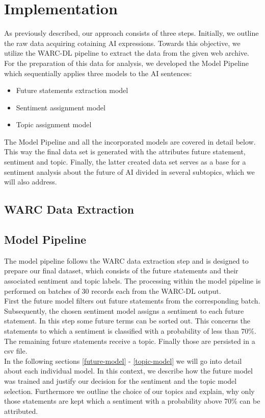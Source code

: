 \section{Implementation}
As previously described, our approach consists of three steps.
Initially, we outline the raw data acquiring cotaining AI expressions.
Towards this objective, we utilize the WARC-DL pipeline \citep{Deckers2022} to extract the data from the given web archive.
For the preparation of this data for analysis, we developed the Model Pipeline which sequentially applies three models to the AI sentences:
\begin{itemize}
    \item Future statements extraction model
    \item Sentiment assignment model
    \item Topic assignment model
\end{itemize}
The Model Pipeline and all the incorporated models are covered in detail below. This way the final data set is generated with the attributes future statement, sentiment and topic.
Finally, the latter created data set serves as a base for a sentiment analysis about the future of AI divided in several subtopics, which we will also address.

\subsection{WARC Data Extraction}

\subsection{Model Pipeline}
The model pipeline follows the WARC data extraction step and is designed to prepare our final dataset, which consists of the future statements and their associated sentiment and topic labels.
The processing within the model pipeline is performed on batches of 30 records each from the WARC-DL output.\\
First the future model filters out future statements from the corresponding batch.
Subsequently, the chosen sentiment model assigns a sentiment to each future statement.
In this step some future terms can be sorted out.
This concerns the statements to which a sentiment is classified with a probability of less than 70\%.
The remaining future statements receive a topic.
Finally those are persisted in a csv file.\\
In the following sections \ref{future-model} - \ref{topic-model} we will go into detail about each individual model.
In this context, we describe how the future model was trained and justify our decision for the sentiment and the topic model selection.
Furthermore we outline the choice of our topics and explain, why only those statements are kept which a sentiment with a probability above 70\% can be attributed.

